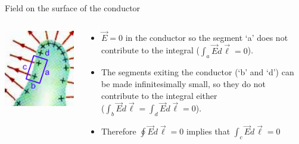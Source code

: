 %
%
%

\begin{frame}{Field on the surface of the conductor}

\begin{columns}
  \begin{column}{0.30\textwidth}
   \begin{center}
     \includegraphics[width=0.99\textwidth]{./images/schematics/conductor_no_tangential_component_circuital_law.png}\\
   \end{center}
  \end{column}
  \begin{column}{0.70\textwidth}
     \begin{itemize}
       \item $\vec{E}=0$ in the conductor so the segment `a' does not contribute
             to the integral ($\int_{a} \vec{E} d\vec{\ell} = 0$).
       \item The segments exiting the conductor (`b' and `d') can be made infinitesimally small,
             so they do not contribute to the integral either\\
             ($\int_{b} \vec{E} d\vec{\ell} = \int_{d} \vec{E} d\vec{\ell} = 0$).
       \item Therefore $\oint \vec{E} d\vec{\ell} = 0$ implies that $\int_{c} \vec{E} d\vec{\ell} = 0$
     \end{itemize}
  \end{column}
\end{columns}


\end{frame}
